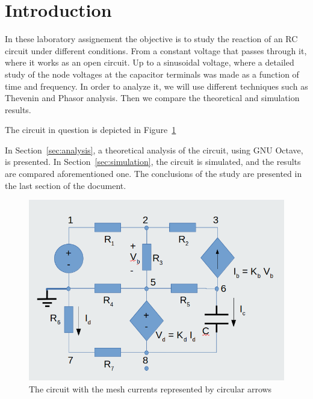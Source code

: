 \section{Introduction}
\label{sec:introduction}



\par In these laboratory assignement the objective is to study the reaction of an RC circuit under different conditions. From a constant voltage that passes through it, where it works as an open circuit. Up to a sinusoidal voltage, where a detailed study of the node voltages at the capacitor terminals was made as a function of time and frequency. In order to analyze it, we will use different techniques such as Thevenin and Phasor analysis. Then we compare the theoretical and simulation results.

\par The circuit in question is depicted in Figure~\ref{fig:circuit} 


\par In Section~\ref{sec:analysis}, a theoretical analysis of the circuit, using GNU Octave,  is presented. In Section~\ref{sec:simulation}, the circuit is simulated, and the results are compared 
aforementioned one. The conclusions of the study are presented in the last section of the document.

 \FloatBarrier 
 \begin{center}
\begin{figure}
  \includegraphics[width=\linewidth]{circuit.png}
  \caption{The circuit with the mesh currents represented by circular arrows}
  \label{fig:circuit}
\end{figure}
\end{center}
\FloatBarrier
